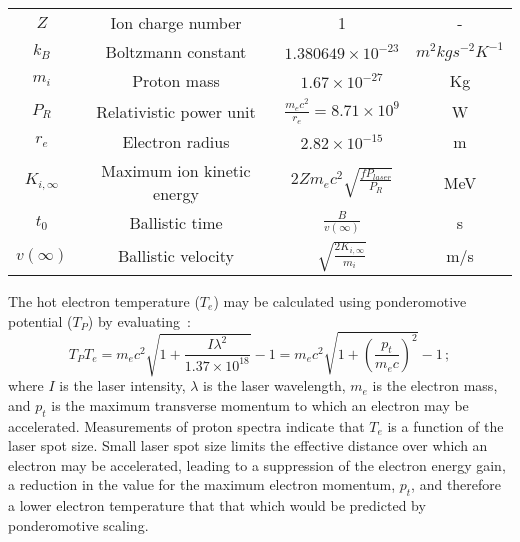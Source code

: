 \begin{table}
\begin{center}
\begin{tabular}{c c c c}
      $Z$ & Ion charge number & 1 & - \\  
      $k_{B}$ & Boltzmann constant & $1.380649 \times 10^{-23}$ & $m^{2} kg s^{-2} K^{-1}$ \\  
      $m_{i}$ & Proton mass & $1.67 \times 10^{-27}$ & Kg \\ 
      $P_{R}$ & Relativistic power unit & $\frac{m_{e} c^{2}}{r_{e}} = 8.71 \times 10^{9}$ & W \\  
      $r_{e}$ & Electron radius & $2.82 \times 10^{-15}$ & m \\  
      $K_{i,\infty}$ & Maximum ion kinetic energy & $2 Z m_{e} c^{2} \sqrt{\frac{f P_{laser}}{P_{R}}}$ & MeV \\  
      $t_{0}$ & Ballistic time & $\frac{B}{v(\infty)}$ & s \\  
      $v(\infty)$ & Ballistic velocity & $\sqrt{\frac{2 K_{i,\infty}}{m_{i}}}$ & m/s \\  
      \hline
    \end{tabular}
  \end{center}
\end{table}

The hot electron temperature ($T_e$) may be calculated using
ponderomotive potential ($T_P$) by
evaluating~\cite{10.1038/nphys199}: 
\begin{equation}
  T_P T_e = m_{e} c^{2} \sqrt{1 + \frac{I \lambda^{2}}{1.37 \times 10^{18}}} -1
          = m_{e} c^{2} \sqrt{1 + \left(\frac{p_t}{m_e c}\right)^2} -1 \,
          ;
  \label{Eq:ElectronTemp}
\end{equation}
where $I$ is the laser intensity, $\lambda$ is the laser wavelength,
$m_e$ is the electron mass, and $p_t$ is the maximum transverse
momentum to which an electron may be accelerated.
Measurements of proton spectra indicate that $T_e$ is a function of
the laser spot size.
Small laser spot size limits the effective distance over which an
electron may be accelerated, leading to a suppression of the electron
energy gain, a reduction in the value for the maximum electron
momentum, $p_t$, and therefore a lower electron temperature that that
which would be predicted by ponderomotive scaling.

